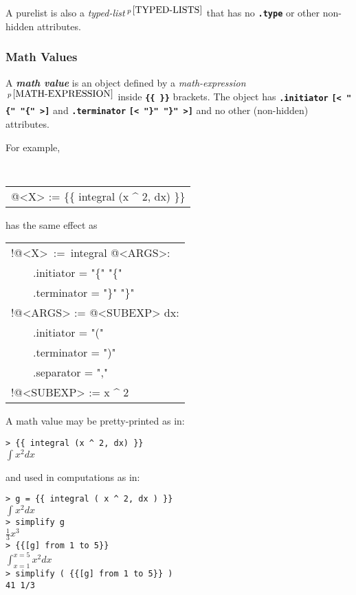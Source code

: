 \documentclass[12pt]{article}
\newcommand{\TT}[1]{{\tt \bfseries #1}}
\newcommand{\key}[1]{{\bf \em #1}\index{#1}}
\newcommand{\pagnote}[1]{$\,^{p\,\pageref{#1}}$}
\newenvironment{indpar}[1][0.3in]%
	{\begin{list}{}%
		     {\setlength{\itemsep}{0in}%
		      \setlength{\topsep}{0in}%
		      \setlength{\parsep}{1ex}%
		      \setlength{\labelwidth}{#1}%
		      \setlength{\leftmargin}{#1}%
		      \addtolength{\leftmargin}{\labelsep}}%
	 \item}%
	{\end{list}}
\begin{document}
A purelist is also a {\em typed-list}\pagnote{TYPED-LISTS} that has
no \TT{.type} or other non-hidden attributes.

\subsubsection{Math Values}
\label{MATH-VALUES}

A \key{math value} is an object defined by a
{\em math-expression}\pagnote{MATH-EXPRESSION}
inside \TT{\{\{~\}\}} brackets.  The object has \TT{.initiator}
\TT{[< "\{" "\{" >]} and \TT{.terminator}
\TT{[< "\}" "\}" >]} and no other (non-hidden) attributes.

For example,
\begin{indpar}
\tt
\begin{tabular}{l}
@<X> := \{\{ integral (x \textasciicircum{} 2, dx) \}\}
\end{tabular}
\end{indpar}
{\rm has the same effect as}
\begin{indpar}
\begin{tabular}{l}
!@<X>~:=~integral @<ARGS>: \\
~~~~.initiator = "\{" "\{" \\
~~~~.terminator = "\}" "\}" \\
!@<ARGS> := @<SUBEXP> dx: \\
~~~~.initiator = "(" \\
~~~~.terminator = ")" \\
~~~~.separator = "," \\
!@<SUBEXP> := x \textasciicircum{} 2 \\
\end{tabular}
\end{indpar}

A math value may be pretty-printed as in:
\begin{indpar}
\verb/> {{ integral (x ^ 2, dx) }}/ \\
$\int x^2 dx$
\end{indpar}

and used in computations as in:
\begin{indpar}
\verb/> g = {{ integral ( x ^ 2, dx ) }}/ \\
$\int x^2 dx$ \\
\verb/> simplify g/ \\
$\frac{1}{3} x^3$ \\
\verb/> {{[g] from 1 to 5}}/ \\
$\int_{x = 1}^{x = 5} x^2 dx$ \\
\verb/> simplify ( {{[g] from 1 to 5}} )/ \\
\verb:41 1/3:
\end{indpar}
\end{document}
